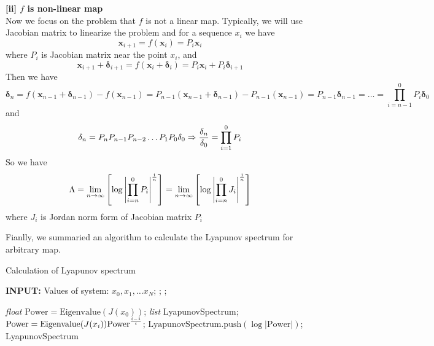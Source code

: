 \documentclass[12pt]{article}
\theoremstyle{plain}
\begin{document}
\textbf{[ii] $f$ is non-linear map}
\\\noindent Now we focus on the problem that $f$ is not a linear map. Typically, we will use Jacobian matrix to linearize the problem and for a sequence $x_i$ we have 
$$
\mathbf x_{i+1} = f(\mathbf x_i) = P_i \mathbf x_i
$$
where $P_i$ is Jacobian matrix near the point $x_i$, and 
$$
\mathbf x_{i+1} + \mathbf\delta_{i+1} = f(\mathbf x_i + \mathbf\delta_{i}) = P_i \mathbf x_i + P_i\mathbf\delta_{i+1}
$$
Then we have 
$$
\mathbf\delta_{n} = f(\mathbf x_{n-1} + \mathbf\delta_{n-1}) - f(\mathbf x_{n-1})
= P_{n-1} (\mathbf x_{n-1} + \mathbf\delta_{n-1}) - P_{n-1}(\mathbf x_{n-1}) = P_{n-1}\mathbf\delta_{n-1}
= \ldots = \prod_{i = n - 1}^{0}P_i\mathbf\delta_0
$$
and 
$$
\mathbf\delta_{n} = P_nP_{n-1}P_{n-2}\ldots P_1 P_0\mathbf\delta_0 \Rightarrow {\delta_n \over \mathbf\delta_0} = \prod_{i = 1}^{0}P_i
$$
So we have 
$$
\Lambda = \lim_{n \rightarrow \infty}\left[\log\left|\prod_{i = n}^{0}P_i\right|^{1\over n}\right] = \lim_{n \rightarrow \infty}\left[\log\left|\prod_{i = n}^{0}J_i\right|^{1\over n}\right]
$$
where $J_i$ is Jordan norm form of Jacobian matrix $P_i$

Fianlly, we summaried an algorithm to calculate the Lyapunov spectrum for arbitrary map.

\begin{algorithm}[H]
\caption{Calculation of Lyapunov spectrum}\label{Lyapunov-spectrum}
\begin{algorithmic}
\State \textbf{INPUT:} Values of system: $x_0, x_1, \ldots x_N$;
\State {};\EndProcedure
\State {};\EndProcedure

\State {}
\State \textit{float} $\text{Power} = \text{Eigenvalue}(J(x_0))$; 
\State \textit{list} LyapunovSpectrum;
    \State $\text{Power} = \text{Eigenvalue}(J(x_i))\text{Power}^{i-1\over i}$;
    \State $\text{LyapunovSpectrum.push}(\log|\text{Power}|)$;
\EndFor
\State \Return LyapunovSpectrum
\EndProcedure
\end{algorithmic}
\end{algorithm}
\end{document}
